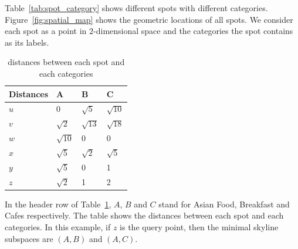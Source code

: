 Table~\ref{tab:spot_category} shows different spots with different categories. Figure~\ref{fig:spatial_map} shows the geometric locations of all spots. We consider each spot as a point in $2$-dimensional space and the categories the spot contains as its labels.

\begin{table}[h]
    \centering
    \begin{tabular}{llll}
    \hline
    Distances & A & B & C \\ \hline
    $u$       & 0 & $\sqrt{5}$ & $\sqrt{10}$ \\ \hline
    $v$       & $\sqrt{2}$ & $\sqrt{13}$ & $\sqrt{18}$ \\ \hline
    $w$       & $\sqrt{10}$ & 0 & 0 \\ \hline
    $x$       & $\sqrt{5}$ & $\sqrt{2}$ & $\sqrt{5}$ \\ \hline
    $y$       & $\sqrt{5}$ & 0 & 1 \\ \hline
    $z$       & $\sqrt{2}$ & 1 & 2 \\ \hline
    \end{tabular}
    \caption{\label{tab:distances_spatial} distances between each spot and each categories}
\end{table}

In the header row of Table~\ref{tab:distances_spatial}, $A$, $B$ and $C$ stand for Asian Food, Breakfast and Cafes respectively. The table shows the distances between each spot and each categories. In this example, if $z$ is the query point, then the minimal skyline subspaces are $(A, B)$ and $(A, C)$.


